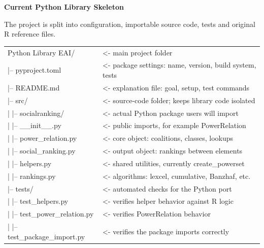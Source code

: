 \documentclass[11pt]{article}
\renewcommand{\arraystretch}{1.45}
\begin{document}
\begin{landscape}
\thispagestyle{empty}
\vspace*{-0.75cm}
\begin{center}
{\Huge\bfseries Current Python Library Skeleton}

\vspace{0.25cm}
{\large The project is split into configuration, importable source code, tests and original R reference files.}
\end{center}

\vspace{0.35cm}

\begin{tcolorbox}[
  enhanced,
  colback=black!87,
  colframe=black!87,
  arc=5mm,
  boxrule=0pt,
  left=9mm,
  right=9mm,
  top=5mm,
  bottom=5mm,
  width=0.94\linewidth,
  center
]
\color{white}
\renewcommand{\arraystretch}{1.08}
\begin{tabularx}{\linewidth}{@{}>{\ttfamily\fontsize{11}{12.3}\selectfont}p{9.7cm} >{\sffamily\fontsize{11}{12.3}\selectfont\raggedright\arraybackslash}X@{}}
Python Library EAI/ & <- main project folder \\
|-- pyproject.toml & <- package settings: name, version, build system, tests \\
|-- README.md & <- explanation file: goal, setup, test commands \\
|-- src/ & <- source-code folder; keeps library code isolated \\
|   |-- socialranking/ & <- actual Python package users will import \\
|       |-- \_\_init\_\_.py & <- public imports, for example PowerRelation \\
|       |-- power\_relation.py & <- core object: coalitions, classes, lookups \\
|       |-- social\_ranking.py & <- output object: rankings between elements \\
|       |-- helpers.py & <- shared utilities, currently create\_powerset \\
|       |-- rankings.py & <- algorithms: lexcel, cumulative, Banzhaf, etc. \\
|-- tests/ & <- automated checks for the Python port \\
|   |-- test\_helpers.py & <- verifies helper behavior against R logic \\
|   |-- test\_power\_relation.py & <- verifies PowerRelation behavior \\
|   |-- test\_package\_import.py & <- verifies the package imports correctly \\

\end{tabularx}
\end{tcolorbox}
\end{landscape}
\end{document}
